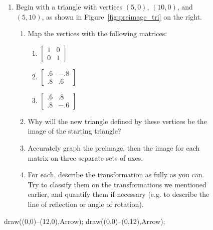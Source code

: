 \documentclass[../gatm.tex]{subfiles}
\begin{document}
\newcommand{\mtrxtbt}[4] {$\left[\begin{array}{cc}#1 & #2 \\ #3 & #4 \end{array}\right]$}

\begin{figure}[h]
	\begin{center}
		\begin{minipage}[c]{0.55\textwidth}
			\begin{enumerate}
				\setcounter{enumi}{\value{mp_problem_i}}
				\item Begin with a triangle with vertices $(5,0)$, $(10,0)$, and $(5,10)$, as shown in Figure~\ref{fig:preimage_tri} on the right. %
				\begin{enumerate}
					\item Map the vertices with the following matrices:
					\begin{multicols}{3}
						\begin{enumerate}
							\item $\left[\begin{array}{cc}1 & 0 \\ 0 & 1 \end{array}\right]$
							\item $\left[\begin{array}{cc}.6 & -.8 \\ .8 & .6 \end{array}\right]$
							\item $\left[\begin{array}{cc}.6 & .8 \\ .8 & -.6 \end{array}\right]$
						\end{enumerate}
					\end{multicols}
					\item Why will the new triangle defined by these vertices be the image of the starting triangle?
					\item Accurately graph the preimage, then the image for each matrix on three separate sets of axes.
					\item For each, describe the transformation as fully as you can. Try to classify them on the transformations we mentioned earlier, and quantify them if necessary (e.g. to describe the line of reflection or angle of rotation).
				\end{enumerate}
				\setcounter{mp_problem_i}{\value{enumi}}
			\end{enumerate}
		\end{minipage}
		\hfill
		\begin{minipage}[c]{0.35\textwidth}
			\begin{center}
				\begin{minipage}[b]{\textwidth}
					\centering
					\begin{asy}[width=0.7\textwidth]
						draw((0,0)--(12,0),Arrow);
						draw((0,0)--(0,12),Arrow);
						

\end{asy}
\end{minipage}
\end{center}
\end{minipage}
\end{center}
\end{figure}
\end{document}
